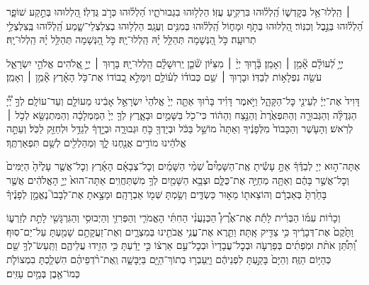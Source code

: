  ׀
הַֽלְלוּ־אֵ֥ל בְּקׇדְשׁ֑וֹ הַֽ֝לְל֗וּהוּ בִּרְקִ֥יעַ עֻזּֽוֹ׃
הַלְל֥וּהוּ בִגְבוּרֹתָ֑יו הַ֝לְל֗וּהוּ כְּרֹ֣ב גֻּדְלֽוֹ׃
הַ֭לְלוּהוּ בְּתֵ֣קַע שׁוֹפָ֑ר הַ֝לְל֗וּהוּ בְּנֵ֣בֶל וְכִנּֽוֹר׃
הַ֭לְלוּהוּ בְּתֹ֣ף וּמָח֑וֹל הַֽ֝לְל֗וּהוּ בְּמִנִּ֥ים וְעֻגָֽב׃
הַלְל֥וּהוּ בְצִלְצְלֵי־שָׁ֑מַע הַֽ֝לְל֗וּהוּ בְּֽצִלְצְלֵ֥י תְרוּעָֽה׃
כֹּ֣ל הַ֭נְּשָׁמָה תְּהַלֵּ֥ל יָ֗הּ הַֽלְלוּ־יָֽהּ׃
\scriptsize{כֹּ֣ל הַ֭נְּשָׁמָה תְּהַלֵּ֥ל יָ֗הּ הַֽלְלוּ־יָֽהּ׃ \\}
\normalsize{}

\negline

יְיָ֥ לְ֝עוֹלָ֗ם אָ֘מֵ֥ן ׀ וְאָמֵֽן׃ \hfill \break
{}בָּ֘ר֤וּךְ יְיָ֨ ׀ מִצִּיּ֗וֹן שֹׁ֘כֵ֤ן יְֽרוּשָׁלָ֗‍ִם הַֽלְלוּ־יָֽהּ׃ \hfill \break
{}בָּר֤וּךְ ׀ יְיָ֣ אֱ֭לֹהִים אֱלֹהֵ֣י יִשְׂרָאֵ֑ל עֹשֵׂ֖ה נִפְלָא֣וֹת לְבַדּֽוֹ׃ וּבָר֤וּךְ ׀ שֵׁ֥ם כְּבוֹד֗וֹ לְע֫וֹלָ֥ם וְיִמָּלֵ֣א כְ֭בוֹדוֹ אֶת־כֹּ֥ל הָאָ֗רֶץ אָ֘מֵ֥ן ׀ וְאָמֵֽן׃





דָּוִיד֙ אֶת־יְיָ֔ לְעֵינֵ֖י כׇּל־הַקָּהָ֑ל וַיֹּ֣אמֶר דָּוִ֗יד בָּר֨וּךְ אַתָּ֤ה יְיָ֙ אֱלֹהֵי֙ יִשְׂרָאֵ֣ל אָבִ֔ינוּ מֵעוֹלָ֖ם וְעַד־עוֹלָֽם׃
לְךָ֣ יְ֠יָ֠ הַגְּדֻלָּ֨ה וְהַגְּבוּרָ֤ה וְהַתִּפְאֶ֙רֶת֙ וְהַנֵּ֣צַח וְהַה֔וֹד כִּי־כֹ֖ל בַּשָּׁמַ֣יִם וּבָאָ֑רֶץ לְךָ֤ יְיָ֙ הַמַּמְלָכָ֔ה וְהַמִּתְנַשֵּׂ֖א לְכֹ֥ל ׀ לְרֹֽאשׁ׃
וְהָעֹ֤שֶׁר וְהַכָּבוֹד֙ מִלְּפָנֶ֔יךָ וְאַתָּה֙ מוֹשֵׁ֣ל בַּכֹּ֔ל וּבְיָדְךָ֖ כֹּ֣חַ וּגְבוּרָ֑ה וּבְיָ֣דְךָ֔ לְגַדֵּ֥ל וּלְחַזֵּ֖ק לַכֹּֽל׃
וְעַתָּ֣ה אֱלֹהֵ֔ינוּ מוֹדִ֥ים אֲנַ֖חְנוּ לָ֑ךְ וּֽמְהַלְלִ֖ים לְשֵׁ֥ם תִּפְאַרְתֶּֽךָ׃


אַתָּה־ה֣וּא
יְיָ לְבַדֶּ֒ךָ֒ אַתָּ֣ עָשִׂ֡יתָ אֶֽת־הַשָּׁמַ֩יִם֩ שְׁמֵ֨י הַשָּׁמַ֜יִם וְכׇל־צְבָאָ֗ם הָאָ֜רֶץ וְכׇל־אֲשֶׁ֤ר עָלֶ֙יהָ֙ הַיַּמִּים֙ וְכׇל־אֲשֶׁ֣ר בָּהֶ֔ם וְאַתָּ֖ה מְחַיֶּ֣ה אֶת־כֻּלָּ֑ם וּצְבָ֥א הַשָּׁמַ֖יִם לְךָ֥ מִשְׁתַּחֲוִֽים׃
אַתָּה־הוּא֙ יְיָ֣ הָאֱלֹהִ֔ים אֲשֶׁ֤ר בָּחַ֙רְתָּ֙ בְּאַבְרָ֔ם וְהוֹצֵאת֖וֹ מֵא֣וּר כַּשְׂדִּ֑ים וְשַׂ֥מְתָּ שְּׁמ֖וֹ אַבְרָהָֽם׃ וּמָצָ֣אתָ אֶת־לְבָבוֹ֮ נֶאֱמָ֣ן לְפָנֶ֒יךָ֒

וְכָר֨וֹת עִמּ֜וֹ הַבְּרִ֗ית לָתֵ֡ת אֶת־אֶ֩רֶץ֩ הַכְּנַעֲנִ֨י הַחִתִּ֜י הָאֱמֹרִ֧י וְהַפְּרִזִּ֛י וְהַיְבוּסִ֥י וְהַגִּרְגָּשִׁ֖י לָתֵ֣ת לְזַרְע֑וֹ וַתָּ֙קֶם֙ אֶת־דְּבָרֶ֔יךָ כִּ֥י צַדִּ֖יק אָֽתָּה׃ וַתֵּ֛רֶא אֶת־עֳנִ֥י אֲבֹתֵ֖ינוּ בְּמִצְרָ֑יִם וְאֶת־זַעֲקָתָ֥ם שָׁמַ֖עְתָּ עַל־יַם־סֽוּף׃ וַ֠תִּתֵּ֠ן אֹתֹ֨ת וּמֹֽפְתִ֜ים בְּפַרְעֹ֤ה וּבְכׇל־עֲבָדָיו֙ וּבְכׇל־עַ֣ם אַרְצ֔וֹ כִּ֣י יָדַ֔עְתָּ כִּ֥י הֵזִ֖ידוּ עֲלֵיהֶ֑ם וַתַּֽעַשׂ־לְךָ֥ שֵׁ֖ם כְּהַיּ֥וֹם הַזֶּֽה׃
וְהַיָּם֙ בָּקַ֣עְתָּ לִפְנֵיהֶ֔ם וַיַּֽעַבְר֥וּ בְתוֹךְ־הַיָּ֖ם בַּיַּבָּשָׁ֑ה וְֽאֶת־רֹ֨דְפֵיהֶ֜ם הִשְׁלַ֧כְתָּ בִמְצוֹלֹ֛ת כְּמוֹ־אֶ֖בֶן בְּמַ֥יִם עַזִּֽים׃


